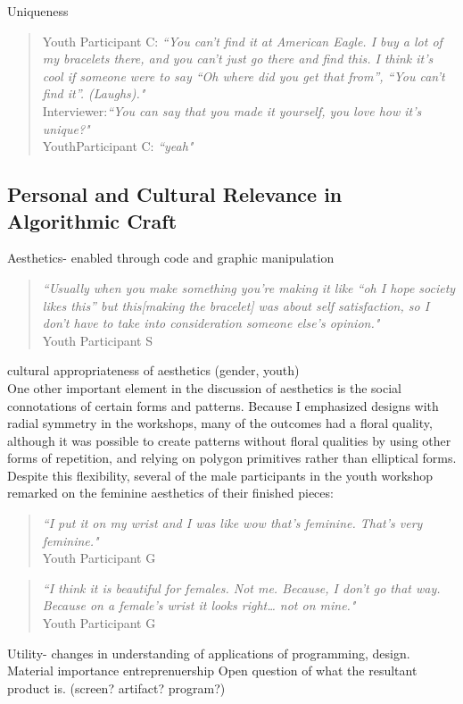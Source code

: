 \documentclass{sigchi}
\begin{document}
Uniqueness
\begin{quotation}
Youth Participant C: \textit{``You can't find it at American Eagle. I buy a lot of my bracelets there, and you can't just go there and find this. I think it's cool if someone were to say “Oh where did you get that from”, “You can't find it”. (Laughs)."}
\\Interviewer:\textit{``You can say that you made it yourself, you love how it's unique?"}
\\YouthParticipant C: \textit{``yeah"}
\end{quotation}

\subsection{Personal and Cultural Relevance in Algorithmic Craft}
Aesthetics- enabled through code and graphic manipulation\\
\begin{quotation}
\textit{``Usually when you make something you're making it like “oh I hope society likes this” but this[making the bracelet] was about self satisfaction, so I don't have to take into consideration someone else's opinion."}
\\Youth Participant S
\end{quotation}

cultural appropriateness of aesthetics (gender, youth)\\
One other important element in the discussion of aesthetics is the social connotations of certain forms and patterns. Because I emphasized designs with radial symmetry in the workshops, many of the outcomes had a floral quality, although it was possible to create patterns without floral qualities by using other forms of repetition, and relying on polygon primitives rather than elliptical forms.  Despite this flexibility, several of the male participants in the youth workshop remarked on the feminine aesthetics of their finished pieces:

\begin{quotation}
 \textit{``I put it on my wrist and I was like wow that's feminine. That's very feminine."} \\Youth Participant G
\end{quotation}

\begin{quotation}
 \textit{``I think it is beautiful for females. Not me. Because, I don't go that way. Because on a female's wrist it looks right… not on mine."}
 \\Youth Participant G
\end{quotation}
Utility- changes in understanding of applications of programming, design.
Material importance
entreprenuership
Open question of what the resultant product is. (screen? artifact? program?)
\end{document}
